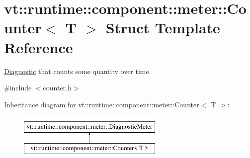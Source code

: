\hypertarget{structvt_1_1runtime_1_1component_1_1meter_1_1_counter}{}\section{vt\+:\+:runtime\+:\+:component\+:\+:meter\+:\+:Counter$<$ T $>$ Struct Template Reference}
\label{structvt_1_1runtime_1_1component_1_1meter_1_1_counter}


\hyperlink{structvt_1_1runtime_1_1component_1_1_diagnostic}{Diagnostic} that counts some quantity over time.  




{\ttfamily \#include $<$counter.\+h$>$}

Inheritance diagram for vt\+:\+:runtime\+:\+:component\+:\+:meter\+:\+:Counter$<$ T $>$\+:\begin{figure}[H]
\begin{center}
\leavevmode
\includegraphics[height=2.000000cm]{structvt_1_1runtime_1_1component_1_1meter_1_1_counter}
\end{center}
\end{figure}
